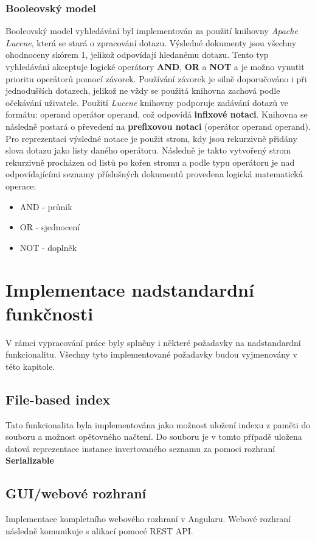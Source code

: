 \documentclass[
12pt,
a4paper,
pdftex,
czech,
titlepage
]{report}
\begin{document}
\subsection{Booleovský model}
Booleovský model vyhledávání byl implementován za použití knihovny \textit{Apache Lucene}, která se stará o zpracování dotazu. Výsledné dokumenty jsou všechny ohodnoceny skórem 1, jelikož odpovídají hledanému dotazu. Tento typ vyhledávání akceptuje logické operátory \textbf{AND}, \textbf{OR} a \textbf{NOT} a je možno vynutit prioritu operátorů pomocí závorek. Používání závorek je silně doporučováno i při jednodušších dotazech, jelikož ne vždy se použitá knihovna zachová podle očekávání uživatele.
Použití \textit{Lucene} knihovny podporuje zadávání dotazů ve formátu: operand operátor operand, což odpovídá \textbf{infixové notaci}. Knihovna se následně postará o převedení na \textbf{prefixovou notaci} (operátor operand operand). Pro reprezentaci výsledné notace je použit strom, kdy jsou rekurzivně přidány slova dotazu jako listy daného operátoru. Následně je takto vytvořený strom rekurzivně procházen od listů po kořen stromu a podle typu operátoru je nad odpovídajícími seznamy příslušných dokumentů provedena logická matematická operace:
\begin{itemize}
    \item AND - průnik
    \item OR - sjednocení
    \item NOT - doplněk
\end{itemize}
\label{maxzadani}
\chapter{Implementace nadstandardní funkčnosti}
V rámci vypracování práce byly splněny i některé požadavky na nadstandardní funkcionalitu. Všechny tyto implementované požadavky budou vyjmenovány v této kapitole.
\section{File-based index}
Tato funkcionalita byla implementována jako možnost uložení indexu z paměti do souboru a možnost opětovného načtení. Do souboru je v tomto případě uložena datová reprezentace instance invertovaného seznamu za pomoci rozhraní \textbf{Serializable}
\section{GUI/webové rozhraní}
Implementace kompletního webového rozhraní v Angularu. Webové rozhraní následně komunikuje s alikací pomocé REST API.
\end{document}
